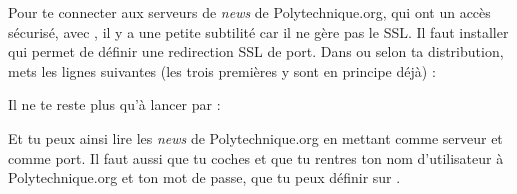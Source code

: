 Pour te connecter aux serveurs de \emph{news} de Polytechnique.org, qui ont un accès sécurisé, avec , il y a une petite subtilité car il
ne gère pas le SSL. Il faut installer  qui permet de définir une redirection SSL de port. Dans  ou
 selon ta distribution, mets les lignes suivantes (les trois premières y sont en principe déjà) :

Il ne te reste plus qu'à lancer  par :

Et tu peux ainsi lire les \emph{news} de Polytechnique.org en mettant  comme serveur et
 comme port. Il faut aussi que tu coches  et
que tu rentres ton nom d'utilisateur à Polytechnique.org et ton mot de passe, que tu peux définir
sur .
